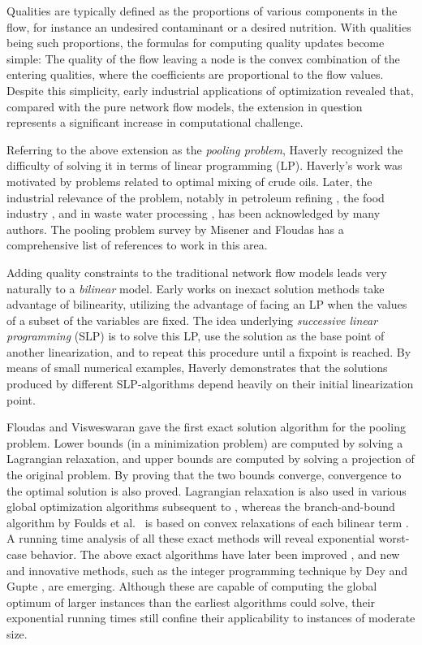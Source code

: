 \documentclass[smallcondensed]{svjour3}
\begin{document}
Qualities are typically defined as the proportions of various components in the flow,
for instance an undesired contaminant or a desired nutrition.
With qualities being such proportions, the formulas for computing quality updates become simple:
The quality of the flow leaving a node is the convex combination of the entering qualities,
where the coefficients are proportional to the flow values.
Despite this simplicity, early industrial applications of optimization revealed that,
compared with the pure network flow models, the extension
in question represents a significant increase in computational challenge.

Referring to the above extension as the \emph{pooling problem},
Haverly \cite{haverly78} recognized the difficulty of solving it in terms of linear programming (LP).
Haverly's work was motivated by problems related to optimal mixing of crude oils.
Later, the industrial relevance of the problem, notably in petroleum refining \cite{baker85,dewitt89},
the food industry \cite{kallrath05}, and in waste water processing \cite{galan98,misener10b},
has been acknowledged by many authors.
The pooling problem survey by Misener and Floudas \cite{misener09b} has a comprehensive list of references to work in this area.

Adding quality constraints to the traditional network flow models leads very naturally to a \emph{bilinear} model.
Early works on inexact solution methods \cite{baker85,dewitt89,haverly78} take advantage of bilinearity,
utilizing the advantage of facing an LP when the values of a subset of the variables are fixed.
The idea underlying \emph{successive linear programming} (SLP) is to solve this LP,
use the solution as the base point of another linearization,
and to repeat this procedure until a fixpoint is reached.
By means of small numerical examples,
Haverly \cite{haverly78,haverly79} demonstrates that the solutions produced by different SLP-algorithms depend heavily on their initial linearization point.

Floudas and Visweswaran \cite{floudas90b} gave the first exact solution algorithm for the pooling problem.
Lower bounds (in a minimization problem) are computed by solving a Lagrangian relaxation, and upper bounds are computed by solving a projection of the original problem.
By proving that the two bounds converge, convergence to the optimal solution is also proved.
Lagrangian relaxation is also used in various global optimization algorithms \cite{adhya99,almutairi09,bental94} subsequent to \cite{floudas90b},
whereas the branch-and-bound algorithm by Foulds et al.\ \cite{foulds92} is based on convex relaxations of each bilinear term \cite{alkhayyal83,mccormick76}. 
A running time analysis of all these exact methods will reveal exponential worst-case behavior.
The above exact algorithms have later been improved \cite{audet04,dey15,misener11,sahinidis05,visweswaran96b},
and new and innovative methods, such as the integer programming technique by Dey and Gupte \cite{dey15}, are emerging.
Although these are capable of computing the global optimum of larger instances than the earliest algorithms could solve,
their exponential running times still confine their applicability to instances of moderate size.
\end{document}

